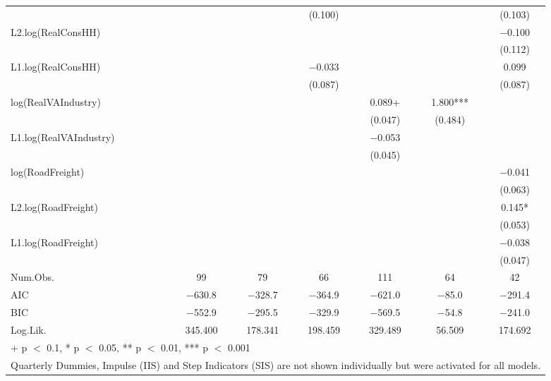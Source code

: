 \begin{table}
{\begin{tabular}[t]{lcccccc}
 &  &  & (\num{0.100}) &  &  & (\num{0.103})\\
L2.log(RealConsHH) &  &  &  &  &  & \num{-0.100}\\
 &  &  &  &  &  & (\num{0.112})\\
L1.log(RealConsHH) &  &  & \num{-0.033} &  &  & \num{0.099}\\
 &  &  & (\num{0.087}) &  &  & (\num{0.087})\\
log(RealVAIndustry) &  &  &  & \num{0.089}+ & \num{1.800}*** & \\
 &  &  &  & (\num{0.047}) & (\num{0.484}) & \\
L1.log(RealVAIndustry) &  &  &  & \num{-0.053} &  & \\
 &  &  &  & (\num{0.045}) &  & \\
log(RoadFreight) &  &  &  &  &  & \num{-0.041}\\
 &  &  &  &  &  & (\num{0.063})\\
L2.log(RoadFreight) &  &  &  &  &  & \num{0.145}*\\
 &  &  &  &  &  & (\num{0.053})\\
L1.log(RoadFreight) &  &  &  &  &  & \num{-0.038}\\
 &  &  &  &  &  & (\num{0.047})\\
\midrule
Num.Obs. & \num{99} & \num{79} & \num{66} & \num{111} & \num{64} & \num{42}\\
AIC & \num{-630.8} & \num{-328.7} & \num{-364.9} & \num{-621.0} & \num{-85.0} & \num{-291.4}\\
BIC & \num{-552.9} & \num{-295.5} & \num{-329.9} & \num{-569.5} & \num{-54.8} & \num{-241.0}\\
Log.Lik. & \num{345.400} & \num{178.341} & \num{198.459} & \num{329.489} & \num{56.509} & \num{174.692}\\
\bottomrule
\multicolumn{7}{l}{\rule{0pt}{1em}+ p $<$ 0.1, * p $<$ 0.05, ** p $<$ 0.01, *** p $<$ 0.001}\\
\multicolumn{7}{l}{\rule{0pt}{1em}Quarterly Dummies, Impulse (IIS) and Step Indicators (SIS) are not shown individually but were activated for all models.}\\
\end{tabular}}
\end{table}
